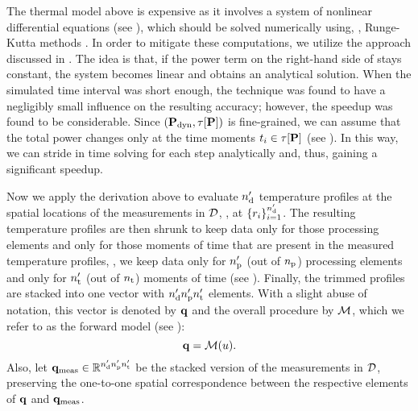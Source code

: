 



The thermal model above is expensive as it involves a system of nonlinear differential equations (see ), which should be solved numerically using, \eg, Runge-Kutta methods \cite{press2007}. In order to mitigate these computations, we utilize the approach discussed in \cite{ukhov2012}.
The idea is that, if the power term on the right-hand side of  stays constant, the system becomes linear and obtains an analytical solution. When the simulated time interval was short enough, the technique was found to have a negligibly small influence on the resulting accuracy; however, the speedup was found to be considerable.
Since $(\mathbf{P}_{\text{dyn}}, \tau[\mathbf{P}])$ is fine-grained, we can assume that the total power changes only at the time moments $t_i \in \tau[\mathbf{P}]$ (see ). In this way, we can stride in time solving  for each step analytically and, thus, gaining a significant speedup.

Now we apply the derivation above to evaluate ${n_\text{d}'}$ temperature profiles at the spatial locations of the measurements in $\mathcal{D}$, \ie, at $\{ r_i \}_{i = 1}^{n_\text{d}'}$. The resulting temperature profiles are then shrunk to keep data only for those processing elements and only for those moments of time that are present in the measured temperature profiles, \ie, we keep data only for ${n_\text{p}'}$ (out of ${n_\text{p}}$) processing elements and only for ${n_\text{t}'}$ (out of ${n_\text{t}}$) moments of time (see ). Finally, the trimmed profiles are stacked into one vector with ${n_\text{d}'} {n_\text{p}'} {n_\text{t}'}$ elements. With a slight abuse of notation, this vector is denoted by $\mathbf{q}$ and the overall procedure by $\model$, which we refer to as the forward model (see ):
\begin{equation} \elabel{model}
  \mvT = \model{\u}.
\end{equation}
Also, let $\mathbf{q}_{\text{meas}} \in \mathbb{R}^{{n_\text{d}'} {n_\text{p}'} {n_\text{t}'}}$ be the stacked version of the measurements in $\mathcal{D}$, preserving the one-to-one spatial correspondence between the respective elements of $\mathbf{q}$ and $\mathbf{q}_{\text{meas}}$.
